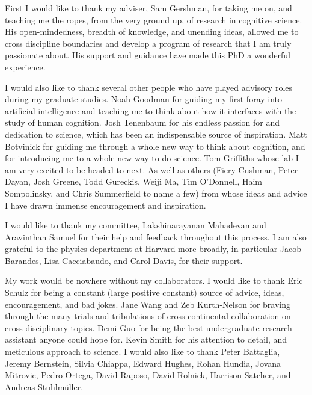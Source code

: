 

First I would like to thank my adviser, Sam Gershman, for taking me on, and teaching me the ropes, from the very ground up, of research in cognitive science. His open-mindedness, breadth of knowledge, and unending ideas, allowed me to cross discipline boundaries and develop a program of research that I am truly passionate about. His support and guidance have made this PhD a wonderful experience.

I would also like to thank several other people who have played advisory roles during my graduate studies. Noah Goodman for guiding my first foray into artificial intelligence and teaching me to think about how it interfaces with the study of human cognition. Josh Tenenbaum for his endless passion for and dedication to science, which has been an indispensable source of inspiration. Matt Botvinick for guiding me through a whole new way to think about cognition, and for introducing me to a whole new way to do science. Tom Griffiths whose lab I am very excited to be headed to next. As well as others (Fiery Cushman, Peter Dayan, Josh Greene, Todd Gureckis, Weiji Ma, Tim O'Donnell, Haim Sompolinsky, and Chris Summerfield to name a few) from whose ideas and advice I have drawn immense encouragement and inspiration.

I would like to thank my committee, Lakshinarayanan Mahadevan and Aravinthan Samuel for their help and feedback throughout this process. I am also grateful to the physics department at Harvard more broadly, in particular Jacob Barandes, Lisa Cacciabaudo, and Carol Davis, for their support.

My work would be nowhere without my collaborators. I would like to thank Eric Schulz for being a constant (large positive constant) source of advice, ideas, encouragement, and bad jokes. Jane Wang and Zeb Kurth-Nelson for braving through the many trials and tribulations of cross-continental collaboration on cross-disciplinary topics. Demi Guo for being the best undergraduate research assistant anyone could hope for. Kevin Smith for his attention to detail, and meticulous approach to science. I would also like to thank Peter Battaglia, Jeremy Bernstein, Silvia Chiappa, Edward Hughes, Rohan Hundia,  Jovana Mitrovic, Pedro Ortega, David Raposo, David Rolnick, Harrison Satcher, and Andreas Stuhlmüller.

